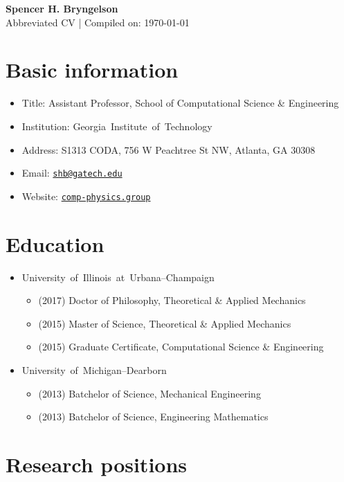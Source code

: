 \documentclass{article}
\newcommand\GIT{\mbox{Georgia Institute of Technology}\xspace}
\newcommand\UIUC{\mbox{University of Illinois at Urbana--Champaign}\xspace}
\newcommand\UMD{\mbox{University of Michigan--Dearborn}\xspace}
\begin{document}
\begin{center}
    {\Large \bf Spencer H. Bryngelson} \\
    \medskip
    Abbreviated CV | Compiled on: \today
\end{center}

\section{Basic information}
\begin{itemize}
    \item Title: Assistant Professor, School of Computational Science \& Engineering
    \item Institution: \GIT
    \item Address: S1313 CODA, 756 W Peachtree St NW, Atlanta, GA 30308
    \item Email: \href{mailto:shb@gatech.edu}{\texttt{shb@gatech.edu}}
    \item Website: \href{https://comp-physics.group}{\texttt{comp-physics.group}}
\end{itemize}

\section{Education}

\begin{itemize}
    \item \UIUC
    \begin{itemize}
        \item (2017) Doctor of Philosophy, Theoretical \& Applied Mechanics
        \item (2015) Master of Science, Theoretical \& Applied Mechanics
        \item (2015) Graduate Certificate, Computational Science \& Engineering
    \end{itemize}
    \item \UMD
    \begin{itemize}
        \item (2013) Batchelor of Science, Mechanical Engineering
        \item (2013) Batchelor of Science, Engineering Mathematics
    \end{itemize}
\end{itemize}


\section{Research positions}
\end{document}
